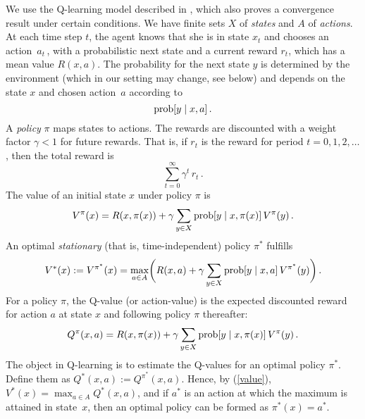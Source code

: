 \documentclass[a4paper,12pt]{article}  %
\theoremstyle{definition}
\def\prob{\hbox{prob}}
\begin{document}
We use the Q-learning model described in \cite{WD92}, which
also proves a convergence result under certain conditions.
We have finite sets $X$ of \textit{states} and $A$ of
\textit{actions}.
At each time step $t$, the agent knows that she is in state
$x_t$ and chooses an action~$a_t$\,, with a probabilistic next
state and a current reward $r_t$, which has a mean value
$R(x,a)$.
The probability for the next state $y$ is determined by the
environment (which in our setting may change, see below) and
depends on the state $x$ and chosen action~$a$ according to 
\begin{equation}
\label{prob}
\prob[y\mid x,a]\,.
\end{equation}
A \textit{policy} $\pi$ maps states to actions.
The rewards are discounted with a weight factor $\gamma<1$
for future rewards.
That is, if $r_t$ is the reward for period $t=0,1,2,\ldots$,
then the total reward is
\begin{equation}
\label{total}
\sum_{t=0}^\infty \gamma^t \,r_t\,.
\end{equation}
The value of an initial state $x$ under policy $\pi$ is
\begin{equation}
\label{value}
V^\pi(x) = R(x,\pi(x))+\gamma\sum_{y\in X} \prob[y\mid x, \pi(x)]\,V^\pi(y) \,.
\end{equation}
An optimal \textit{stationary} (that is, time-independent)
policy $\pi^*$ fulfills
\begin{equation}
\label{opt}
V^*(x):=V^{\pi^*}(x)=\max_{a\in A}\biggl(
R(x,a)+\gamma\sum_{y\in X} \prob[y\mid x,
a]\,V^{\pi^*}(y)\biggr)\,.
\end{equation}
For a policy $\pi$, the Q-value (or action-value)
is the expected discounted reward for action $a$ at state
$x$ and following policy $\pi$ thereafter:
\begin{equation}
\label{defq}
Q^\pi(x,a) = R(x,\pi(x))+\gamma\sum_{y\in X} \prob[y\mid x, \pi(x)]\,V^\pi(y) \,.
\end{equation}
The object in Q-learning is to estimate the
Q-values for an optimal policy $\pi^*$.
Define them as $Q^*(x, a):= Q^{\pi^*}(x, a)$.
Hence, by (\ref{value}), $V^*(x) =\max_{a\in A} Q^*(x, a)$,
and if $a^*$ is an action at which the maximum is attained
in state~$x$, then an optimal policy can be formed as
$\pi^*(x) = a^*$.
\end{document}
